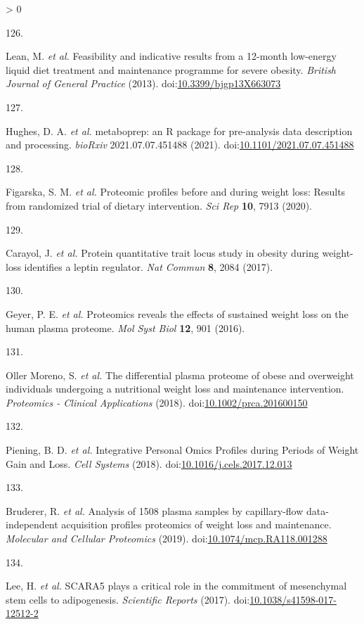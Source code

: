\documentclass[11pt,twoside]{bristolthesis}
\newlength{\cslhangindent}
\newlength{\csllabelwidth}
\newenvironment{CSLReferences}[2] %
 {%
  \setlength{\parindent}{0pt}
  \ifodd #1 \everypar{\setlength{\hangindent}{\cslhangindent}}\ignorespaces\fi
  \ifnum #2 > 0
  \setlength{\parskip}{#2\baselineskip}
  \fi
 }%
 {}
\newcommand{\CSLLeftMargin}[1]{\parbox[t]{\csllabelwidth}{#1}}
\newcommand{\CSLRightInline}[1]{\parbox[t]{\linewidth - \csllabelwidth}{#1}\break}
\begin{document}
\begin{CSLReferences}{0}{0}
\leavevmode\hypertarget{ref-Lean2013}{}%
\CSLLeftMargin{126. }
\CSLRightInline{Lean, M. \emph{et al.} {Feasibility and indicative results from a 12-month low-energy liquid diet treatment and maintenance programme for severe obesity}. \emph{British Journal of General Practice} (2013). doi:\href{https://doi.org/10.3399/bjgp13X663073}{10.3399/bjgp13X663073}}

\leavevmode\hypertarget{ref-Hughes2021}{}%
\CSLLeftMargin{127. }
\CSLRightInline{Hughes, D. A. \emph{et al.} {metaboprep: an R package for pre-analysis data description and processing}. \emph{bioRxiv} 2021.07.07.451488 (2021). doi:\href{https://doi.org/10.1101/2021.07.07.451488}{10.1101/2021.07.07.451488}}

\leavevmode\hypertarget{ref-Figarska2020}{}%
\CSLLeftMargin{128. }
\CSLRightInline{Figarska, S. M. \emph{et al.} {Proteomic profiles before and during weight loss: Results from randomized trial of dietary intervention}. \emph{Sci Rep} \textbf{10}, 7913 (2020).}

\leavevmode\hypertarget{ref-Carayol2017}{}%
\CSLLeftMargin{129. }
\CSLRightInline{Carayol, J. \emph{et al.} {Protein quantitative trait locus study in obesity during weight-loss identifies a leptin regulator}. \emph{Nat Commun} \textbf{8}, 2084 (2017).}

\leavevmode\hypertarget{ref-Geyer2016}{}%
\CSLLeftMargin{130. }
\CSLRightInline{Geyer, P. E. \emph{et al.} {Proteomics reveals the effects of sustained weight loss on the human plasma proteome}. \emph{Mol Syst Biol} \textbf{12}, 901 (2016).}

\leavevmode\hypertarget{ref-OllerMoreno2018}{}%
\CSLLeftMargin{131. }
\CSLRightInline{Oller Moreno, S. \emph{et al.} {The differential plasma proteome of obese and overweight individuals undergoing a nutritional weight loss and maintenance intervention}. \emph{Proteomics - Clinical Applications} (2018). doi:\href{https://doi.org/10.1002/prca.201600150}{10.1002/prca.201600150}}

\leavevmode\hypertarget{ref-Piening2018}{}%
\CSLLeftMargin{132. }
\CSLRightInline{Piening, B. D. \emph{et al.} {Integrative Personal Omics Profiles during Periods of Weight Gain and Loss}. \emph{Cell Systems} (2018). doi:\href{https://doi.org/10.1016/j.cels.2017.12.013}{10.1016/j.cels.2017.12.013}}

\leavevmode\hypertarget{ref-Bruderer2019}{}%
\CSLLeftMargin{133. }
\CSLRightInline{Bruderer, R. \emph{et al.} {Analysis of 1508 plasma samples by capillary-flow data-independent acquisition profiles proteomics of weight loss and maintenance}. \emph{Molecular and Cellular Proteomics} (2019). doi:\href{https://doi.org/10.1074/mcp.RA118.001288}{10.1074/mcp.RA118.001288}}

\leavevmode\hypertarget{ref-Lee2017a}{}%
\CSLLeftMargin{134. }
\CSLRightInline{Lee, H. \emph{et al.} {SCARA5 plays a critical role in the commitment of mesenchymal stem cells to adipogenesis}. \emph{Scientific Reports} (2017). doi:\href{https://doi.org/10.1038/s41598-017-12512-2}{10.1038/s41598-017-12512-2}}

\end{CSLReferences}
\end{document}

